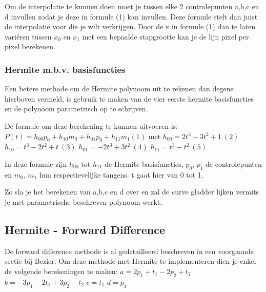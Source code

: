 \documentclass[a4paper,11pt,oneside, titlepage]{article}
\begin{document}
Om de interpolatie te kunnen doen moet je tussen elke 2 controlepunten a,b,c en d invullen
zodat je deze in formule (1) kan invullen. Deze formule stelt dan juist de interpolatie 
voor die je wilt verkrijgen. Door de x in formule (1) dan te laten vari\'eren tussen 
$x_0$ en $x_1$ met een bepaalde stapgrootte kan je de lijn pixel per pixel berekenen.
\subsubsection{Hermite m.b.v. basisfuncties}
Een betere methode om de Hermite polynoom uit te rekenen dan degene hierboven vermeld, is gebruik te maken van de vier eerste hermite basisfuncties en de polynoom parametrisch op te schrijven.

De formule om deze berekening te kunnen uitvoeren is:\newline \newline
$P(t) = h_{00}p_0 + h_{10}m_0 + h_{01}p_0 + h_{11}m_1(1)$\newline \newline
met\newline \newline
$h_{00} = 2t^3 - 3t^2 + 1\ (2)$\newline
$h_{10} = t^3 - 2t^2 + t\ (3)$\newline
$h_{01} = -2t^3 + 3t^2\ (4)$\newline
$h_{11} = t^3 - t^2\ (5)$\newline

In deze formule zijn $h_{00}$ tot $h_{11}$ de Hermite basisfuncties, $p_0$, $p_1$ 
de controlepunten en $m_0$, $m_1$ hun respectievelijke tangens. t gaat hier van 0 tot 1.

Zo sla je het berekenen van a,b,c en d over en zal de curve gladder lijken vermits je
met parametrische beschreven polynoom werkt.
\subsection{Hermite - Forward Difference}
De forward difference methode is al gedetailleerd beschreven in een voorgaande
sectie bij Bezier. Om deze methode met Hermite te implementeren dien je enkel
de volgende berekeningen te maken:\newline \newline
$a = 2p_1 + t_1 - 2p_2 + t_2$\newline
$b = -3p_1 - 2t_1 + 3p_2 - t_2$\newline
$c = t_1$\newline
$d = p_1$\newline \newline
\end{document}
